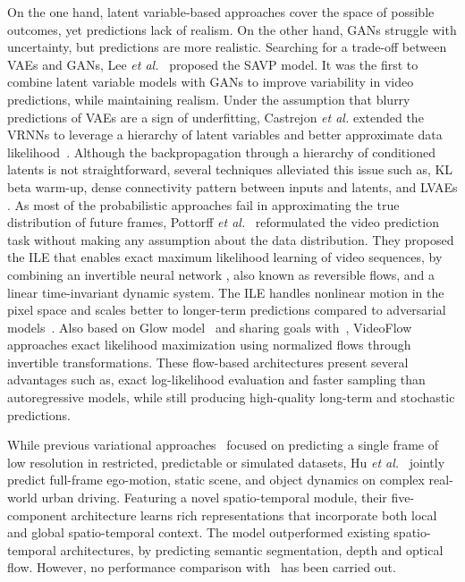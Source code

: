 On the one hand, latent variable-based approaches cover the space of possible outcomes, yet predictions lack of realism. On the other hand, \acp{GAN} struggle with uncertainty, but predictions are more realistic. Searching for a trade-off between \acp{VAE} and \acp{GAN}, Lee \textit{et al.}~\cite{Lee2018} proposed the \ac{SAVP} model. It was the first to combine latent variable models with \acp{GAN} to improve variability in video predictions, while maintaining realism. Under the assumption that blurry predictions of \acp{VAE} are a sign of underfitting, Castrejon \textit{et al.} extended the \acp{VRNN} to leverage a hierarchy of latent variables and better approximate data likelihood~\cite{Castrejon2019}. Although the backpropagation through a hierarchy of conditioned latents is not straightforward, several techniques alleviated this issue such as, KL beta warm-up, dense connectivity pattern between inputs and latents, and \acp{LVAE} \cite{Sonderby2016}. As most of the probabilistic approaches fail in approximating the true distribution of future frames, Pottorff \textit{et al.}~\cite{Pottorff2019} reformulated the video prediction task without making any assumption about the data distribution. They proposed the \ac{ILE} that enables exact maximum likelihood learning of video sequences, by combining an invertible neural network \cite{Kingma2018}, also known as reversible flows, and a linear time-invariant dynamic system. The \ac{ILE} handles nonlinear motion in the pixel space and scales better to longer-term predictions compared to adversarial models~\cite{Mathieu2016}. Also based on Glow model~\cite{Kingma2018} and sharing goals with~\cite{Pottorff2019}, VideoFlow~\cite{Kumar2020} approaches exact likelihood maximization using normalized flows through invertible transformations. These flow-based architectures present several advantages such as, exact log-likelihood evaluation and faster sampling than autoregressive models, while still producing high-quality long-term and stochastic predictions.

While previous variational approaches~\cite{Denton2018,Lee2018} focused on predicting a single frame of low resolution in restricted, predictable or simulated datasets, Hu \textit{et al.}~\cite{Hu2020} jointly predict full-frame ego-motion, static scene, and object dynamics on complex real-world urban driving. Featuring a novel spatio-temporal module, their five-component architecture learns rich representations that incorporate both local and global spatio-temporal context. The model outperformed existing spatio-temporal architectures, by predicting semantic segmentation, depth and optical flow. However, no performance comparison with~\cite{Denton2018,Lee2018} has been carried out.

